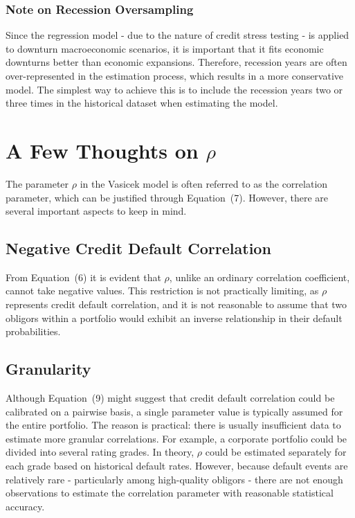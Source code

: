 \documentclass[11pt,a4paper]{article}
\begin{document}
\subsubsection{Note on Recession Oversampling}

Since the regression model - due to the nature of credit stress testing - is applied to downturn macroeconomic scenarios, it is important that it fits economic downturns better than economic expansions. Therefore, recession years are often over-represented in the estimation process, which results in a more conservative model. The simplest way to achieve this is to include the recession years two or three times in the historical dataset when estimating the model.

\section{A Few Thoughts on $\rho$}

The parameter $\rho$ in the Vasicek model is often referred to as the correlation parameter, which can be justified through Equation~(7). However, there are several important aspects to keep in mind.

\subsection{Negative Credit Default Correlation}

From Equation~(6) it is evident that $\rho$, unlike an ordinary correlation coefficient, cannot take negative values. This restriction is not practically limiting, as $\rho$ represents credit default correlation, and it is not reasonable to assume that two obligors within a portfolio would exhibit an inverse relationship in their default probabilities.

\subsection{Granularity}

Although Equation~(9) might suggest that credit default correlation could be calibrated on a pairwise basis, a single parameter value is typically assumed for the entire portfolio. The reason is practical: there is usually insufficient data to estimate more granular correlations. For example, a corporate portfolio could be divided into several rating grades. In theory, $\rho$ could be estimated separately for each grade based on historical default rates. However, because default events are relatively rare - particularly among high-quality obligors - there are not enough observations to estimate the correlation parameter with reasonable statistical accuracy.
\end{document}
